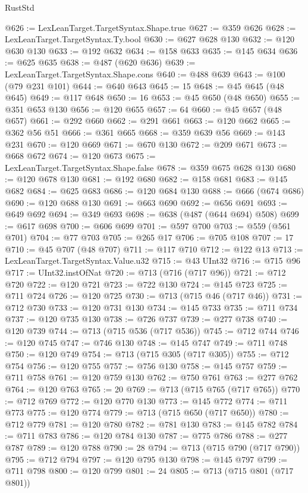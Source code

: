 \begin{lexlean}{RustStd}
\begin{coremodule}
@626 := LexLeanTarget.TargetSyntax.Shape.true
@627 := @359 @626
@628 := LexLeanTarget.TargetSyntax.Ty.bool
@630 := @627 @628 @130
@632 := @120 @630 @130
@633 := @192 @632
@634 := @158 @633
@635 := @145 @634
@636 := @625 @635
@638 := @487 (@620 @636)
@639 := LexLeanTarget.TargetSyntax.Shape.cons
@640 := @488 @639
@643 := @100 (@79 @231 @101)
@644 := @640 @643
@645 := 15
@648 := @45 @645 (@48 @645)
@649 := @117 @648
@650 := 16
@653 := @45 @650 (@48 @650)
@655 := @351 @653 @130
@656 := @120 @655
@657 := 64
@660 := @45 @657 (@48 @657)
@661 := @292 @660
@662 := @291 @661
@663 := @120 @662
@665 := @362 @56 @51
@666 := @361 @665
@668 := @359 @639 @56
@669 := @143 @231
@670 := @120 @669
@671 := @670 @130
@672 := @209 @671
@673 := @668 @672
@674 := @120 @673
@675 := LexLeanTarget.TargetSyntax.Shape.false
@678 := @359 @675 @628 @130
@680 := @120 @678 @130
@681 := @192 @680
@682 := @158 @681
@683 := @145 @682
@684 := @625 @683
@686 := @120 @684 @130
@688 := @666 (@674 @686)
@690 := @120 @688 @130
@691 := @663 @690
@692 := @656 @691
@693 := @649 @692
@694 := @349 @693
@698 := @638 (@487 (@644 @694) @508)
@699 := @617 @698
@700 := @606 @699
@701 := @597 @700
@703 := @559 (@561 @701)
@704 := @77 @703
@705 := @265 @17
@706 := @705 @108
@707 := 17
@710 := @45 @707 (@48 @707)
@711 := @117 @710
@712 := @122 @13
@713 := LexLeanTarget.TargetSyntax.Value.u32
@715 := @43 UInt32
@716 := @715 @96
@717 := UInt32.instOfNat
@720 := @713 (@716 (@717 @96))
@721 := @712 @720
@722 := @120 @721
@723 := @722 @130
@724 := @145 @723
@725 := @711 @724
@726 := @120 @725
@730 := @713 (@715 @46 (@717 @46))
@731 := @712 @730
@733 := @120 @731 @130
@734 := @145 @733
@735 := @711 @734
@737 := @120 @735 @130
@738 := @726 @737
@739 := @277 @738
@740 := @120 @739
@744 := @713 (@715 @536 (@717 @536))
@745 := @712 @744
@746 := @120 @745
@747 := @746 @130
@748 := @145 @747
@749 := @711 @748
@750 := @120 @749
@754 := @713 (@715 @305 (@717 @305))
@755 := @712 @754
@756 := @120 @755
@757 := @756 @130
@758 := @145 @757
@759 := @711 @758
@761 := @120 @759 @130
@762 := @750 @761
@763 := @277 @762
@764 := @120 @763
@765 := 20
@769 := @713 (@715 @765 (@717 @765))
@770 := @712 @769
@772 := @120 @770 @130
@773 := @145 @772
@774 := @711 @773
@775 := @120 @774
@779 := @713 (@715 @650 (@717 @650))
@780 := @712 @779
@781 := @120 @780
@782 := @781 @130
@783 := @145 @782
@784 := @711 @783
@786 := @120 @784 @130
@787 := @775 @786
@788 := @277 @787
@789 := @120 @788
@790 := 28
@794 := @713 (@715 @790 (@717 @790))
@795 := @712 @794
@797 := @120 @795 @130
@798 := @145 @797
@799 := @711 @798
@800 := @120 @799
@801 := 24
@805 := @713 (@715 @801 (@717 @801))

\end{coremodule}
\end{lexlean}
